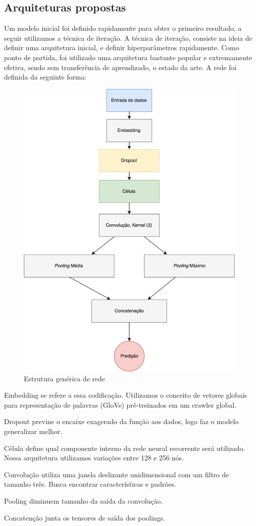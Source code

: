 \documentclass[12pt]{article}
\begin{document}
\subsection{Arquiteturas propostas}

Um modelo inicial foi definido rapidamente para obter o primeiro resultado, a seguir utilizamos a técnica de iteração. A técnica de iteração, consiste na ideia de definir uma arquitetura inicial, e definir hiperparâmetros rapidamente. Como ponto de partida, foi utilizado uma arquitetura bastante popular e extremamente efetiva, sendo sem transferência de aprendizado, o estado da arte. A rede foi definida da seguinte forma:

\begin{figure}[ht]
\centering
\includegraphics[width=.5\textwidth]{images/graph.png}
\caption{Estrutura genérica de rede}
\label{fig:graph}
\end{figure}

Embedding se refere a essa codificação. Utilizamos o conceito de vetores globais para representação de palavras (GloVe) pré-treinados em um crawler global.

Dropout previne o encaixe exagerado da função aos dados, logo faz o modelo generalizar melhor.

Célula define qual componente interno da rede neural recorrente será utilizado. Nessa arquitetura utilizamos variações entre 128 e 256 nós.

Convolução utiliza uma janela deslizante unidimensional com um filtro de tamanho três. Busca encontrar características e padrões.

Pooling diminuem tamanho da saída da convolução.

Concatenção junta os tensores de saída dos poolings.
\end{document}
